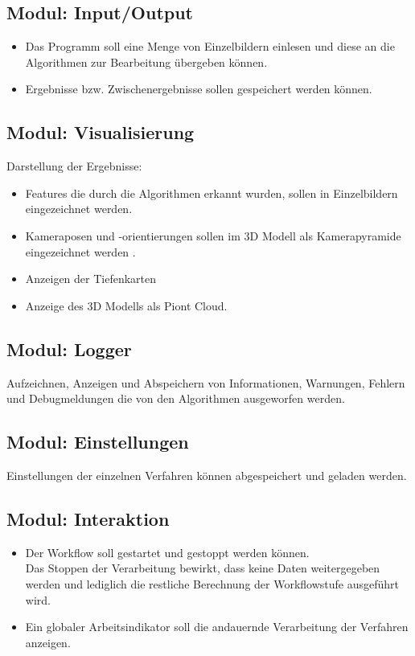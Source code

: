\subsection{Modul: Input/Output}
\begin{itemize}
	\item Das Programm soll eine Menge von Einzelbildern einlesen und diese an die Algorithmen zur Bearbeitung übergeben können.
	\item Ergebnisse bzw. Zwischenergebnisse sollen gespeichert werden können.
\end{itemize}
\subsection{Modul: Visualisierung}
Darstellung der Ergebnisse:
\begin{itemize}
	\item Features die durch die Algorithmen erkannt wurden, sollen in Einzelbildern eingezeichnet werden.
	\item Kameraposen und -orientierungen sollen im 3D Modell als Kamerapyramide eingezeichnet werden .
	\item Anzeigen der Tiefenkarten
	\item Anzeige des 3D Modells als Piont Cloud.
\end{itemize}
\subsection{Modul: Logger}
Aufzeichnen, Anzeigen und Abspeichern von Informationen, Warnungen, Fehlern und Debugmeldungen die von den Algorithmen ausgeworfen werden.
\subsection{Modul: Einstellungen}
Einstellungen der einzelnen Verfahren können abgespeichert und geladen werden.
\subsection{Modul: Interaktion}
\begin{itemize}
	\item Der Workflow soll gestartet und gestoppt werden können.\\Das Stoppen der Verarbeitung bewirkt, dass keine Daten weitergegeben werden und lediglich die restliche Berechnung der Workflowstufe ausgeführt wird.
	\item Ein globaler Arbeitsindikator soll die andauernde Verarbeitung der Verfahren anzeigen.
\end{itemize}

